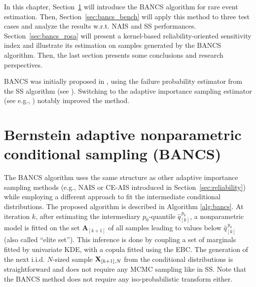In this chapter, Section~\ref{sec:bancs} will introduce the BANCS algorithm for rare event estimation. 
Then, Section~\ref{sec:bancs_bench} will apply this method to three test cases and analyze the results w.r.t. NAIS and SS performances. 
Section~\ref{sec:bancs_rosa} will present a kernel-based reliability-oriented sensitivity index and illustrate its estimation on samples generated by the BANCS algorithm. 
Then, the last section presents some conclusions and research perspectives.

\medskip
\begin{remark}
    BANCS was initially proposed in \citet{fekhari_ICASP_2023}, using the failure probability estimator from the SS algorithm (see ). 
    Switching to the adaptive importance sampling estimator (see e.g., ) notably improved the method.    
\end{remark}
\medskip


\section{Bernstein adaptive nonparametric conditional sampling (BANCS)}\label{sec:bancs}

The BANCS algorithm uses the same structure as other adaptive importance sampling methods (e.g., NAIS or CE-AIS introduced in Section~\ref{sec:reliability}) while employing a different approach to fit the intermediate conditional distributions. 
The proposed algorithm is described in Algorithm \ref{alg:bancs}. 
At iteration $k$, after estimating the intermediary $p_0$-quantile $\widehat{q}_{[k]}^{\, p_0}$, a nonparametric model is fitted on the set $\mathbf{A}_{[k+1]}$ of all samples leading to values below $\widehat{q}_{[k]}^{\, p_0}$ (also called ``elite set'').  
This inference is done by coupling a set of marginals fitted by univariate KDE, with a copula fitted using the EBC. 
The generation of the next i.i.d. $N$-sized sample ${\bf X}_{[k+1], N}$ from the conditional distributions is straightforward and does not require any MCMC sampling like in SS. 
Note that the BANCS method does not require any iso-probabilistic transform either.

